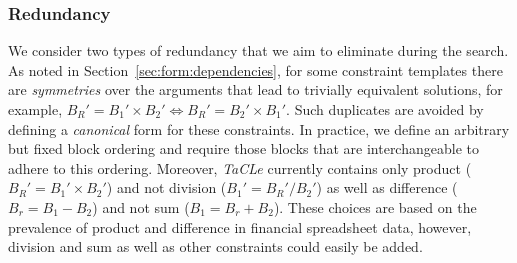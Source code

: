 \documentclass{IEEEtran}
\newcommand{\samuel}[1]{\textcolor{green}{{\sc Samuel:} #1}\xspace}
\newcommand{\format}[1]{\textit{#1}\xspace}
\newcommand{\sname}{\format{TaCLe}}
\newcommand{\eccalc}[2]{\ensuremath{#1 = #2}}
\newcommand{\ecprod}[3]{\eccalc{#1}{#2 \times #3}}
\newcommand{\ecdiff}[3]{\eccalc{#1}{#2 - #3}}
\theoremstyle{definition}
\begin{document}
%





\subsubsection{Redundancy}
We consider two types of redundancy that we aim to eliminate during the search.
As noted in Section~\ref{sec:form:dependencies}, for some constraint templates there are \textit{symmetries} over the arguments that lead to trivially equivalent solutions, for example, $\ecprod{B_R'}{B_1'}{B_2'} \Leftrightarrow \ecprod{B_R'}{B_2'}{B_1'}$.
Such duplicates are avoided by defining a \textit{canonical} form for these constraints.
In practice, we define an arbitrary but fixed block ordering and require those blocks that are interchangeable to adhere to this ordering.
Moreover, \sname currently contains only product (\ecprod{B_R'}{B_1'}{B_2'}) and not division (\eccalc{B_1'}{B_R' / B_2'}) as well as difference (\ecdiff{B_r}{B_1}{B_2}) and not sum (\eccalc{B_1}{B_r + B_2}).
These choices are based on the prevalence of product and difference in financial spreadsheet data, however, division and sum as well as other constraints could easily be added.
\end{document}
